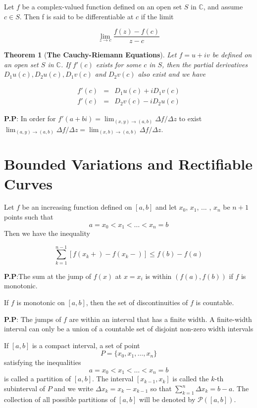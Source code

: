 \documentclass[10pt,a4paper]{book}
\begin{document}
\begin{deff}
 Let $f$ be a complex-valued function defined on an open set $S$ in $\mathbb{C}$, and assume $c \in S$. Then f is said to be differentiable at $c$ if the limit 
 
 $$\lim_{z \rightarrow c}\dfrac{f(z) - f(c)}{z - c}$$
 
\end{deff}
\newtheorem{Thmm}[]{Theorem}

\begin{Thmm}[\textbf{The Cauchy-Riemann Equations}]Let $f = u + iv$ be defined on an open set $S$ in $\mathbb{C}$. If $f'(c)$ exists for
some $c$ in $S$, then the partial derivatives $D_1u(c), D_2u(c), D_1v(c)$ and $D_2v(c)$ also exist and we have

\begin{eqnarray}
f'(c)& = & D_1u(c) + iD_1v(c)\\
f'(c)& = & D_2v(c) - iD_2u(c)
\end{eqnarray}

\end{Thmm}
\noindent \textbf{P.P}: In order for $f'(a + bi) = \lim_{(x,y) \rightarrow (a,b)} \Delta f/ \Delta z$ to exist $\lim_{(a,y) \rightarrow (a,b)} \Delta f/ \Delta z = \lim_{(x,b) \rightarrow (a,b)}\Delta f/ \Delta z$.

\chapter{Bounded Variations and Rectifiable Curves}
\begin{Thm}
Let $f$ be an increasing function defined on $[a, b]$ and let $x_0$, $x_1$, ... , $x_n$
be $n + 1$ points such that
$$a = x_0 < x_1 < \dots < x_n = b$$
Then we have the inequality

$$\sum_{k = 1}^{n-1} [f(x_k +) - f(x_k -)] \leq f(b)-f(a)$$


\end{Thm}
\noindent \textbf{P.P}:The sum at the jump of $f(x)$ at $x = x_i$ is within $(f(a), f(b))$ if $f$ is monotonic.

\begin{Thm}
If $f$ is monotonic on $[a, b]$, then the set of discontinuities of $f$ is countable.
\end{Thm}
\noindent \textbf{P.P}: The jumps of $f$ are within an interval that has a finite width. A finite-width interval can only be a union of a countable set of disjoint non-zero width intervals

\begin{deff}
If $[a, b]$ is a compact interval, a set of point
$$P = \{x_0, x_1, \dots, x_n\}$$
satisfying the inequalities
$$a = x_0 < x_1 < \dots < x_n = b$$
is called a partition of $[a, b]$. The interval $[x_{k-1}, x_k]$ is called the $k$-th subinterval of $P$ and we write $\Delta x_k = x_{k}- x_{k-1} $ so that $\sum_{k = 1}^n \Delta x_k = b - a$. The collection of all possible partitions of $[a, b]$ will be denoted by $\mathcal{P}([a, b])$.
\end{deff}
\end{document}
